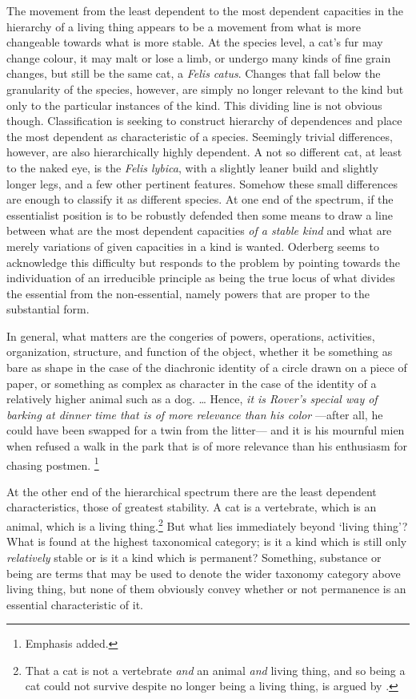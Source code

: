 The movement from the least dependent to the most dependent capacities in the hierarchy of a living thing appears to be a movement from what is more changeable towards what is more stable. At the species level, a cat's fur may change colour, it may malt or lose a limb, or undergo many kinds of fine grain changes, but still be the same cat, a \emph{Felis catus}. Changes that fall below the granularity of the species, however, are simply no longer relevant to the kind but only to the particular instances of the kind. This dividing line is not obvious though. Classification is seeking to construct hierarchy of dependences and place the most dependent as characteristic of a species. Seemingly trivial differences, however, are also hierarchically highly dependent.  A not so different cat, at least to the naked eye, is the \emph{Felis lybica}, with a slightly leaner build and slightly longer legs, and a few other pertinent features. Somehow these small differences are enough to classify it as different species. At one end of the spectrum, if the essentialist position is to be robustly defended then some means to draw a line between what are the most dependent capacities \emph{of a stable kind} and what are merely variations of given capacities in a kind is wanted. Oderberg seems to acknowledge this difficulty but responds to the problem by pointing towards the individuation of an irreducible principle as being the true locus of what divides the essential from the non-essential, namely powers that are proper to the substantial form.
\begin{quoting}
In general, what matters are the congeries of powers, operations, activities, organization, structure, and function of the object, whether it be something as bare as shape in the case of the diachronic identity of a circle drawn on a piece of paper, or something as complex as character in the case of the identity of a relatively higher animal such as a dog. {\ldots} Hence, \emph{it is Rover's special way of barking at dinner time that is of more relevance than his color} ---after all, he could have been swapped for a twin from the litter--- and it is his mournful mien when refused a walk in the park that is of more relevance than his enthusiasm for chasing postmen.
\parencite[][]{Oderberg2005-ODEHD}\footnote{Emphasis added.}
\end{quoting}

At the other end of the hierarchical spectrum there are the least dependent characteristics, those of greatest stability. A cat is a vertebrate, which is an animal, which is a living thing.\footnote{That a cat is not a vertebrate \emph{and} an animal \emph{and} living thing, and so being a cat could not survive despite no longer being a living thing, is argued by \textcite[][81--83]{Oderberg2005-ODEHD}.}
But what lies immediately beyond `living thing'? What is found at the highest taxonomical category; is it a kind which is still only \emph{relatively} stable or is it a kind which is permanent? Something, substance or being are terms that may be used to denote the wider taxonomy category above living thing, but none of them obviously convey whether or not permanence is an essential characteristic of it.

